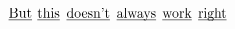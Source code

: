 \def\undertext#1{$\underline{\smash{\hbox{#1}}}$}


\undertext{But}
\undertext{this}
\undertext{doesn't}
\undertext{always}
\undertext{work}
\undertext{right}


\bye


